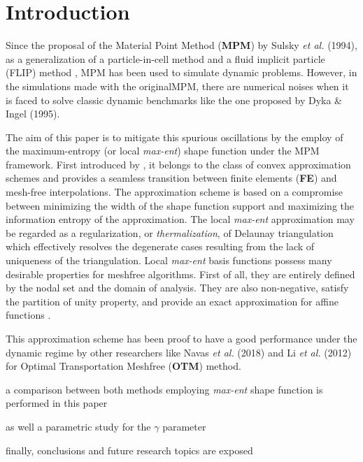 \section{Introduction}
\label{intro}
Since the proposal of the Material Point Method (\textbf{MPM}) by Sulsky {\it
  et al.} (1994)\cite{Sulsky1994}, as a generalization of
a particle-in-cell method \cite{Harlow1956} and a fluid implicit
particle (FLIP) method \cite{Brackbill1986}, MPM has been used to
simulate dynamic problems. However, in the simulations made with the
originalMPM, there are numerical noises \cite{Tran2019e} when it is faced to solve
classic dynamic benchmarks like the one proposed by Dyka \& Ingel
(1995)\cite{Dyka1995}. 

The aim of this paper is to mitigate this spurious oscillations by the
employ of the maximum-entropy (or local \textit{max-ent}) shape
function under the MPM framework. First introduced by
\cite{Arroyo2006}, it belongs to the class of convex 
approximation schemes and provides a seamless transition between
finite elements (\textbf{FE}) and mesh-free interpolations. The
approximation scheme is based on a compromise between minimizing the
width of the shape function support and maximizing the information
entropy of the approximation. The local \textit{max-ent} approximation
may be regarded as a regularization, or \textit{thermalization}, of
Delaunay triangulation which effectively resolves the degenerate cases
resulting from the lack of uniqueness of the triangulation. Local
\textit{max-ent} basis functions possess many desirable properties for
meshfree algorithms. First of all, they are entirely defined by the
nodal set and the domain of analysis. They are also non-negative, satisfy the partition of unity
property, and provide an exact approximation for affine functions \cite{Arroyo2006}.

This approximation scheme has been proof to have a good performance
under the dynamic regime by other researchers like Navas {\it et al.}
(2018)\cite{Navas2018a} and Li {\it et al.} (2012)\cite{Li2012} for
Optimal Transportation Meshfree (\textbf{OTM}) method.

a comparison between both methods employing \textit{max-ent}  shape
function is performed in this paper

as well a parametric study for the $\gamma$ parameter

finally, conclusions and future research topics are exposed

